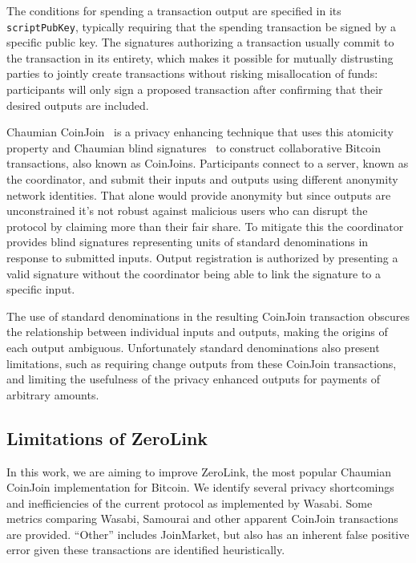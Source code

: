 \documentclass{article}
\begin{document}
The conditions for spending a transaction output are specified in its \texttt{scriptPubKey}, typically requiring that the spending transaction be signed by a specific public key. The signatures authorizing a transaction usually commit to the transaction in its entirety, which makes it possible for mutually distrusting parties to jointly create transactions without risking misallocation of funds: participants will only sign a proposed transaction after confirming that their desired outputs are included.

Chaumian CoinJoin~\cite{mizrahi2013blind}\cite{maxwell2013coinjoin}\cite{zerolink} is a privacy enhancing technique that uses this atomicity property and Chaumian blind signatures~\cite{chaum1983blind} to construct collaborative Bitcoin transactions, also known as CoinJoins. Participants connect to a server, known as the coordinator, and submit their inputs and outputs using different anonymity network identities. That alone would provide anonymity but since outputs are unconstrained it's not robust against malicious users who can disrupt the protocol by claiming more than their fair share. To mitigate this the coordinator provides blind signatures representing units of standard denominations in response to submitted inputs. Output registration is authorized by presenting a valid signature without the coordinator being able to link the signature to a specific input.

The use of standard denominations in the resulting CoinJoin transaction obscures the relationship between individual inputs and outputs, making the origins of each output ambiguous. Unfortunately standard denominations also present limitations, such as requiring change outputs from these CoinJoin transactions, and limiting the usefulness of the privacy enhanced outputs for payments of arbitrary amounts.

\subsection{Limitations of ZeroLink}
In this work, we are aiming to improve ZeroLink, the most popular Chaumian CoinJoin implementation for Bitcoin. We identify several privacy shortcomings and inefficiencies of the current protocol as implemented by Wasabi. Some metrics comparing Wasabi, Samourai and other apparent CoinJoin transactions are provided. ``Other'' includes JoinMarket, but also has an inherent false positive error given these transactions are identified heuristically.
\end{document}

